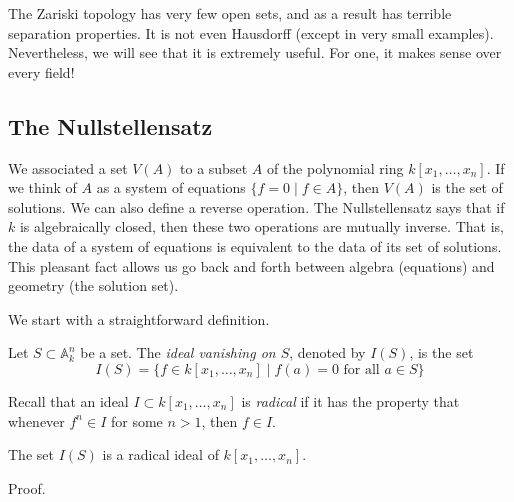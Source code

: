 \documentclass[11pt]{article}
\begin{document}
The Zariski topology has very few open sets, and as a result has terrible separation properties.
It is not even Hausdorff (except in very small examples).
Nevertheless, we will see that it is extremely useful.
For one, it makes sense over every field!

\subsection{The Nullstellensatz}
\label{sec:org95569fc}
We associated a set \(V(A)\) to a subset \(A\) of the polynomial ring \(k[x_1,\dots,x_n]\).
If we think of \(A\) as a system of equations \(\{f = 0 \mid f \in A\}\), then \(V(A)\) is the set of solutions.
We can also define a reverse operation.
The Nullstellensatz says that if \(k\) is algebraically closed, then these two operations are mutually inverse.
That is, the data of a system of equations is equivalent to the data of its set of solutions.
This pleasant fact allows us go back and forth between algebra (equations) and geometry (the solution set).

We start with a straightforward definition.
\begin{definition}
Let \(S \subset \mathbb A^n_k\) be a set.
The \emph{ideal vanishing on \(S\)}, denoted by \(I(S)\), is the set
\[ I(S) = \{f \in k[x_1,\dots,x_n] \mid f(a) = 0 \text{ for all } a \in S\}\]
\end{definition}

Recall that an ideal \(I \subset k[x_1,\dots,x_n]\) is \emph{radical} if it has the property that whenever \(f^n \in I\) for some \(n > 1\), then \(f \in I\).
\begin{proposition}
The set \(I(S)\) is a radical ideal of \(k[x_1,\dots,x_n]\).
\end{proposition}
\begin{skipped}
Proof.
\end{skipped}
\end{document}
